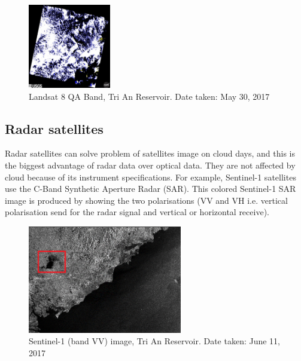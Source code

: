 \begin{figure}
	\centering
	\includegraphics[width=0.32\textwidth]{figures/qaL8.jpg}
	\caption{Landsat 8 QA Band, Tri An Reservoir. Date taken: May 30, 2017}
\end{figure}

\subsection{Radar satellites}

Radar satellites can solve problem of satellites image on cloud days, and this is the biggest advantage of radar data over optical data. They are not affected by cloud because of its instrument specifications. For example, Sentinel-1 satellites use the C-Band Synthetic Aperture Radar (SAR). This colored Sentinel-1 SAR image is produced by showing the two polarisations (VV and VH i.e. vertical polarisation send for the radar signal and vertical or horizontal receive). 

\begin{figure}[h!]
	\centering
	\includegraphics[width=0.6\textwidth]{figures/sarImgVVS1.png}
	\caption{Sentinel-1 (band VV) image, Tri An Reservoir. Date taken: June 11, 2017}
\end{figure}	

